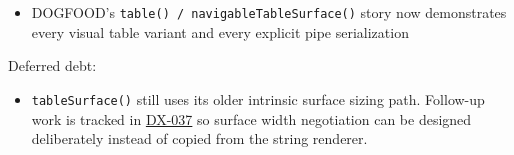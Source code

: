 \begin{itemize}
  accessible output remains row/header/value oriented instead of inheriting a visual variant
\item
  DOGFOOD's \texttt{t\allowbreak{}a\allowbreak{}b\allowbreak{}l\allowbreak{}e\allowbreak{}(\allowbreak{})\allowbreak{} \allowbreak{}/\allowbreak{} \allowbreak{}n\allowbreak{}a\allowbreak{}v\allowbreak{}i\allowbreak{}g\allowbreak{}a\allowbreak{}b\allowbreak{}l\allowbreak{}e\allowbreak{}T\allowbreak{}a\allowbreak{}b\allowbreak{}l\allowbreak{}e\allowbreak{}S\allowbreak{}u\allowbreak{}r\allowbreak{}f\allowbreak{}a\allowbreak{}c\allowbreak{}e\allowbreak{}(\allowbreak{})} story now demonstrates every visual table variant and every explicit pipe serialization
\end{itemize}

Deferred debt:

\begin{itemize}
\tightlist
\item
  \texttt{t\allowbreak{}a\allowbreak{}b\allowbreak{}l\allowbreak{}e\allowbreak{}S\allowbreak{}u\allowbreak{}r\allowbreak{}f\allowbreak{}a\allowbreak{}c\allowbreak{}e\allowbreak{}(\allowbreak{})} still uses its older intrinsic surface sizing path. Follow-up work is tracked in \href{https://github.com/flyingrobots/bijou/blob/1853ad902f6bf219326409e7f743a5a1d6517dbc/docs/method/backlog/up-next/DX-037-table-surface-responsive-width-parity.md}{DX-037} so surface width negotiation can be designed deliberately instead of copied from the string renderer.
\end{itemize}

